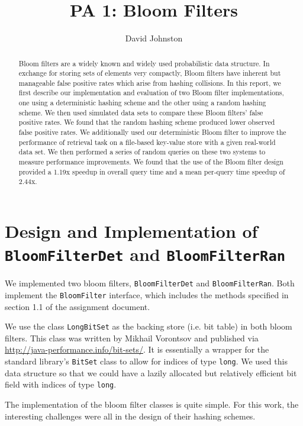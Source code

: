 \documentclass{article}
\title{PA 1: Bloom Filters}
\author{David Johnston}
\begin{document}
\maketitle

\begin{abstract}
\noindent
Bloom filters are a widely known and widely used probabilistic data structure.
In exchange for storing sets of elements very compactly, Bloom filters have
inherent but manageable false positive rates which arise from hashing
collisions. In this report, we first describe our implementation and evaluation
of two Bloom filter implementations, one using a deterministic hashing scheme
and the other using a random hashing scheme. We then used simulated data sets to
compare these Bloom filters' false positive rates. We found that the random
hashing scheme produced lower observed false positive rates. We additionally
used our deterministic Bloom filter to improve the performance of retrieval task
on a file-based key-value store with a given real-world data set. We then
performed a series of random queries on these two systems to measure performance
improvements. We found that the use of the Bloom filter design provided a 1.19x
speedup in overall query time and a mean per-query time speedup of 2.44x.
\end{abstract}

\section{Design and Implementation of \texttt{BloomFilterDet} and
         \texttt{BloomFilterRan}}

We implemented two bloom filters, \texttt{BloomFilterDet} and
\texttt{BloomFilterRan}. Both implement the \texttt{BloomFilter} interface,
which includes the methods specified in section 1.1 of the assignment document.

We use the class \texttt{LongBitSet} as the backing store (i.e. bit table) in
both bloom filters. This class was written by Mikhail Vorontsov and published
via \url{http://java-performance.info/bit-sets/}. It is essentially a wrapper
for the standard library's \texttt{BitSet} class to allow for indices of type
\texttt{long}. We used this data structure so that we could have a lazily
allocated but relatively efficient bit field with indices of type \texttt{long}.

The implementation of the bloom filter classes is quite simple. For this work,
the interesting challenges were all in the design of their hashing schemes.
\end{document}
